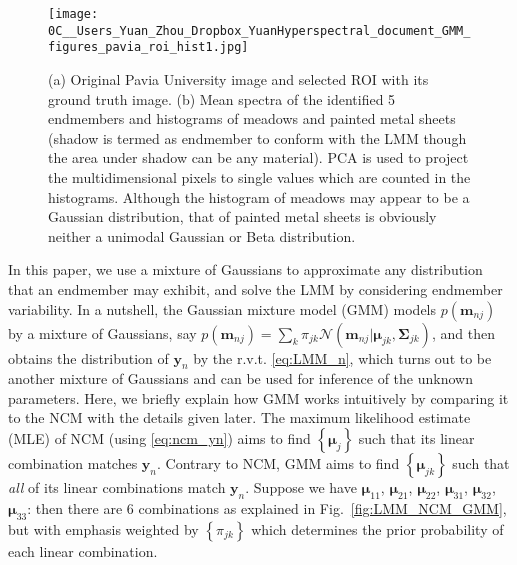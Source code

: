 \documentclass[twocolumn,english]{IEEEtran}
\theoremstyle{plain}
\begin{document}
\begin{figure}
\begin{centering}
\texttt{[image: 0C\_\_Users\_Yuan\_Zhou\_Dropbox\_YuanHyperspectral\_document\_GMM\_figures\_pavia\_roi\_hist1.jpg]}
\par\end{centering}
\caption{(a) Original Pavia University image and selected ROI with its ground
truth image. (b) Mean spectra of the identified 5 endmembers and histograms
of meadows and painted metal sheets (shadow is termed as endmember
to conform with the LMM though the area under shadow can be any material).
PCA is used to project the multidimensional pixels to single values
which are counted in the histograms. Although the histogram of meadows
may appear to be a Gaussian distribution, that of painted metal sheets
is obviously neither a unimodal Gaussian or Beta distribution.}

\label{fig:pavia_roi=000026hist}
\end{figure}

In this paper, we use a mixture of Gaussians to approximate any distribution
that an endmember may exhibit, and solve the LMM by considering endmember
variability. In a nutshell, the Gaussian mixture model (GMM) models
$p\left(\mathbf{m}_{nj}\right)$ by a mixture of Gaussians, say $p\left(\mathbf{m}_{nj}\right)=\sum_{k}\pi_{jk}\mathcal{N}\left(\mathbf{m}_{nj}|\boldsymbol{\mu}_{jk},\boldsymbol{\Sigma}_{jk}\right)$,
and then obtains the distribution of $\mathbf{y}_{n}$ by the r.v.t.
\eqref{eq:LMM_n}, which turns out to be another mixture of Gaussians
and can be used for inference of the unknown parameters. Here, we
briefly explain how GMM works intuitively by comparing it to the NCM
with the details given later. The maximum likelihood estimate (MLE)
of NCM (using \eqref{eq:ncm_yn}) aims to find $\left\{ \boldsymbol{\mu}_{j}\right\} $
such that its linear combination matches $\mathbf{y}_{n}$. Contrary
to NCM, GMM aims to find $\left\{ \boldsymbol{\mu}_{jk}\right\} $
such that \emph{all} of its linear combinations match $\mathbf{y}_{n}$.
Suppose we have $\boldsymbol{\mu}_{11}$, $\boldsymbol{\mu}_{21}$,
$\boldsymbol{\mu}_{22}$, $\boldsymbol{\mu}_{31}$, $\boldsymbol{\mu}_{32}$,
$\boldsymbol{\mu}_{33}$: then there are 6 combinations as explained
in Fig.~\ref{fig:LMM_NCM_GMM}, but with emphasis weighted by $\left\{ \pi_{jk}\right\} $
which determines the prior probability of each linear combination.
\end{document}
